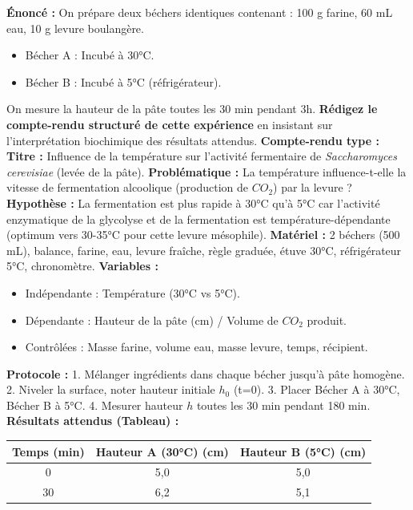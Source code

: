 \documentclass[11pt]{article}
\begin{document}
\begin{exoresolu}
    \textbf{Énoncé :} On prépare deux béchers identiques contenant : 100 g farine, 60 mL eau, 10 g levure boulangère.
    \begin{itemize}
        \item Bécher A : Incubé à 30°C.
        \item Bécher B : Incubé à 5°C (réfrigérateur).
    \end{itemize}
    On mesure la hauteur de la pâte toutes les 30 min pendant 3h.
    \textbf{Rédigez le compte-rendu structuré de cette expérience} en insistant sur l'interprétation biochimique des résultats attendus.
    \tcblower
    \textbf{Compte-rendu type :}
    \textbf{Titre :} Influence de la température sur l'activité fermentaire de \emph{Saccharomyces cerevisiae} (levée de la pâte).
    \textbf{Problématique :} La température influence-t-elle la vitesse de fermentation alcoolique (production de $CO_2$) par la levure ?
    \textbf{Hypothèse :} La fermentation est plus rapide à 30°C qu'à 5°C car l'activité enzymatique de la glycolyse et de la fermentation est température-dépendante (optimum vers 30-35°C pour cette levure mésophile).
    \textbf{Matériel :} 2 béchers (500 mL), balance, farine, eau, levure fraîche, règle graduée, étuve 30°C, réfrigérateur 5°C, chronomètre.
    \textbf{Variables :}
    \begin{itemize}
        \item Indépendante : Température (30°C vs 5°C).
        \item Dépendante : Hauteur de la pâte (cm) / Volume de $CO_2$ produit.
        \item Contrôlées : Masse farine, volume eau, masse levure, temps, récipient.
    \end{itemize}
    \textbf{Protocole :}
    1. Mélanger ingrédients dans chaque bécher jusqu'à pâte homogène.
    2. Niveler la surface, noter hauteur initiale $h_0$ (t=0).
    3. Placer Bécher A à 30°C, Bécher B à 5°C.
    4. Mesurer hauteur $h$ toutes les 30 min pendant 180 min.
    \textbf{Résultats attendus (Tableau) :}
    \begin{center}
    \begin{tabular}{|c|c|c|}\hline
    \textbf{Temps (min)} & \textbf{Hauteur A (30°C) (cm)} & \textbf{Hauteur B (5°C) (cm)} \\ \hline
    0 & 5,0 & 5,0 \\ \hline
    30 & 6,2 & 5,1 \\ \hline

\end{tabular}
\end{center}
\end{exoresolu}
\end{document}
